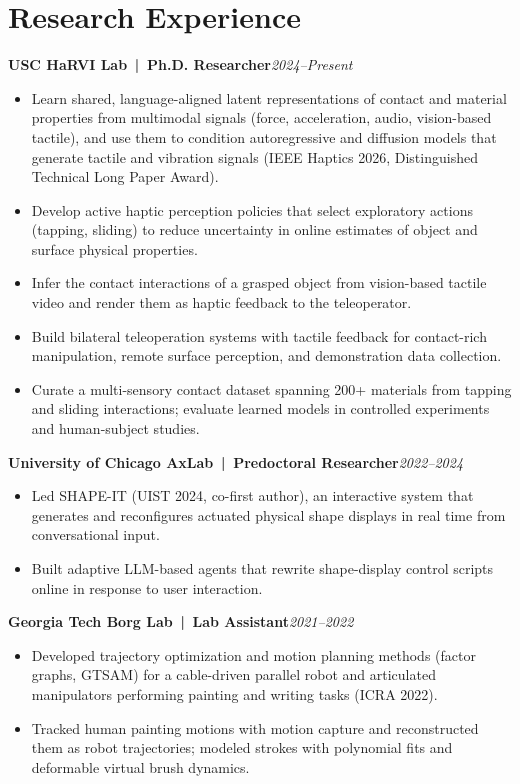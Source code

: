 \documentclass[10pt,letterpaper]{article}
\newcommand{\entry}[2]{\textbf{#1}\hfill\textit{#2}\\}
\begin{document}
\section{Research Experience}
\entry{USC HaRVI Lab \,|\, Ph.D. Researcher}{2024--Present}
\vspace{-11pt}
\begin{itemize}
  \item Learn shared, language-aligned latent representations of contact and material properties from multimodal signals
        (force, acceleration, audio, vision-based tactile), and use them to condition autoregressive and diffusion models that
        generate tactile and vibration signals (IEEE Haptics 2026, Distinguished Technical Long Paper Award).
  \item Develop active haptic perception policies that select exploratory actions (tapping, sliding) to reduce uncertainty in
        online estimates of object and surface physical properties.
  \item Infer the contact interactions of a grasped object from vision-based tactile video and render them as haptic feedback
        to the teleoperator.
  \item Build bilateral teleoperation systems with tactile feedback for contact-rich manipulation, remote surface perception,
        and demonstration data collection.
  \item Curate a multi-sensory contact dataset spanning 200+ materials from tapping and sliding interactions; evaluate learned
        models in controlled experiments and human-subject studies.
\end{itemize}

\entry{University of Chicago AxLab \,|\, Predoctoral Researcher}{2022--2024}
\vspace{-11pt}
\begin{itemize}
  \item Led SHAPE-IT (UIST 2024, co-first author), an interactive system that generates and reconfigures actuated physical
        shape displays in real time from conversational input.
  \item Built adaptive LLM-based agents that rewrite shape-display control scripts online in response to user interaction.
\end{itemize}

\entry{Georgia Tech Borg Lab \,|\, Lab Assistant}{2021--2022}
\vspace{-11pt}
\begin{itemize}
  \item Developed trajectory optimization and motion planning methods (factor graphs, GTSAM) for a cable-driven parallel
        robot and articulated manipulators performing painting and writing tasks (ICRA 2022).
  \item Tracked human painting motions with motion capture and reconstructed them as robot trajectories; modeled strokes
        with polynomial fits and deformable virtual brush dynamics.
\end{itemize}
\end{document}
